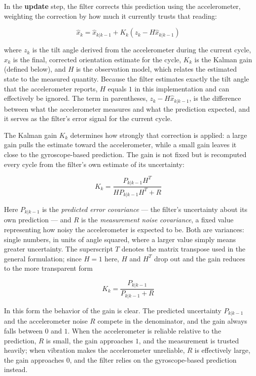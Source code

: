 In the \textbf{update} step, the filter corrects this prediction using the accelerometer, weighting the correction by how much it currently trusts that reading:
 
\[
\hat{x}_k = \hat{x}_{k|k-1} + K_k\left(z_k - H\hat{x}_{k|k-1}\right)
\]
 
where $z_k$ is the tilt angle derived from the accelerometer during the current cycle, $\hat{x}_k$ is the final, corrected orientation estimate for the cycle, $K_k$ is the Kalman gain (defined below), and $H$ is the observation model, which relates the estimated state to the measured quantity. Because the filter estimates exactly the tilt angle that the accelerometer reports, $H$ equals $1$ in this implementation and can effectively be ignored. The term in parentheses, $z_k - H\hat{x}_{k|k-1}$, is the difference between what the accelerometer measures and what the prediction expected, and it serves as the filter's error signal for the current cycle.
 
The Kalman gain $K_k$ determines how strongly that correction is applied: a large gain pulls the estimate toward the accelerometer, while a small gain leaves it close to the gyroscope-based prediction. The gain is not fixed but is recomputed every cycle from the filter's own estimate of its uncertainty:
 
\[
K_k = \frac{P_{k|k-1}H^{T}}{H P_{k|k-1} H^{T} + R}
\]
 
Here $P_{k|k-1}$ is the \emph{predicted error covariance} --- the filter's uncertainty about its own prediction --- and $R$ is the \emph{measurement noise covariance}, a fixed value representing how noisy the accelerometer is expected to be. Both are variances: single numbers, in units of angle squared, where a larger value simply means greater uncertainty. The superscript $T$ denotes the matrix transpose used in the general formulation; since $H = 1$ here, $H$ and $H^{T}$ drop out and the gain reduces to the more transparent form
 
\[
K_k = \frac{P_{k|k-1}}{P_{k|k-1} + R}
\]
 
In this form the behavior of the gain is clear. The predicted uncertainty $P_{k|k-1}$ and the accelerometer noise $R$ compete in the denominator, and the gain always falls between $0$ and $1$. When the accelerometer is reliable relative to the prediction, $R$ is small, the gain approaches $1$, and the measurement is trusted heavily; when vibration makes the accelerometer unreliable, $R$ is effectively large, the gain approaches $0$, and the filter relies on the gyroscope-based prediction instead.
 
